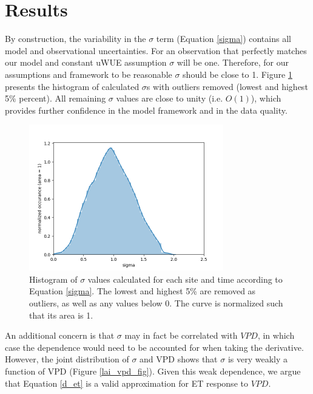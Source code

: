\documentclass[draft,linenumbers]{gcbjournal}
\begin{document}
\section{Results}
\label{results}

By construction, the variability in the $\sigma$ term (Equation \ref{sigma}) contains all model and observational uncertainties. For an observation that perfectly matches our model and constant uWUE assumption $\sigma$ will be one. Therefore, for our assumptions and framework to be reasonable $\sigma$ should be close to 1. Figure \ref{lai_fig} presents the histogram of calculated $\sigma$s with outliers removed (lowest and highest 5\% percent). All remaining $\sigma$ values are close to unity (i.e. $O(1)$), which provides further confidence in the model framework and in the data quality.

\begin{figure}[!p]
\centering
\includegraphics[width=20pc]{./fig02.png}
\caption{Histogram of $\sigma$ values calculated for each site and time according to Equation \ref{sigma}. The lowest and highest 5\% are removed as outliers, as well as any values below 0. The curve is normalized such that its area is 1. }
\label{lai_fig}
\end{figure}

An additional concern is that $\sigma$ may in fact be correlated with $VPD$, in which case the dependence would need to be accounted for when taking the derivative. However, the joint distribution of $\sigma$ and VPD shows that $\sigma$ is very weakly a function of VPD (Figure \ref{lai_vpd_fig}). Given this weak dependence, we argue that Equation \ref{d_et} is a valid approximation for ET response to $VPD$.
\end{document}
